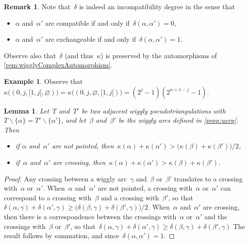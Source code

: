 \documentclass{amsart}
\newtheorem{lemma}[theorem]{Lemma}
\theoremstyle{definition}
\newtheorem{example}[theorem]{Example}
\newtheorem{remark}[theorem]{Remark}
\renewcommand{\b}[1]{{\boldsymbol{#1}}} %
\newcommand{\ssm}{\smallsetminus} %
\newcommand{\vincent}[1]{\todo[color=blue!30]{\rm #1 \\ \hfill --- V.}}
\begin{document}
\begin{remark}
Note that~$\delta$ is indeed an incompatibility degree in the sense that
\begin{itemize}
\item $\alpha$ and~$\alpha'$ are compatible if and only if~$\delta(\alpha, \alpha') = 0$,
\item $\alpha$ and~$\alpha'$ are exchangeable if and only if~$\delta(\alpha, \alpha') = 1$.
\end{itemize}
Observe also that~$\delta$ (and thus~$\kappa$) is preserved by the automorphisms of \cref{rem:wigglyComplexAutomorphism}.
\end{remark}


\begin{example}
Observe that
$\kappa \big( (0, j, {[1,j[}, \varnothing) \big) 
= \kappa \big( (0, j, \varnothing, {[1,j[}) \big) 
= (2^j-1)(2^{n+1-j}-1)$.
\end{example}

\begin{lemma}
\label{lem:wallCrossingInequalities}
Let~$T$ and~$T'$ be two adjacent wiggly pseudotriangulations with~$T \ssm \{\alpha\} = T' \ssm \{\alpha'\}$, and let~$\beta$ and~$\beta'$ be the wiggly arcs defined in \cref{prop:uerp}.
Then
\begin{itemize}
\item if $\alpha$ and~$\alpha'$ are not pointed, then~$\kappa(\alpha) + \kappa(\alpha') > \big( \kappa(\beta) + \kappa(\beta') \big) / 2$,
\item if~$\alpha$ and~$\alpha'$ are crossing, then~${\kappa(\alpha) + \kappa(\alpha') > \kappa(\beta) + \kappa(\beta')}$.
\end{itemize}
\end{lemma}

\begin{proof}
Any crossing between a wiggly arc~$\gamma$ and~$\beta$ or~$\beta'$ translates to a crossing with~$\alpha$ or~$\alpha'$.
When~$\alpha$ and~$\alpha'$ are not pointed, a crossing with~$\alpha$ or~$\alpha'$ can correspond to a crossing with~$\beta$ and a crossing with~$\beta'$, so that~$\delta(\alpha, \gamma) + \delta(\alpha', \gamma) \ge \big( \delta(\beta, \gamma) + \delta(\beta', \gamma) \big) / 2$.
When~$\alpha$ and~$\alpha'$ are crossing, then there is a correspondence between the crossings with~$\alpha$ or~$\alpha'$ and the crossings with~$\beta$ or~$\beta'$, so that~$\delta(\alpha, \gamma) + \delta(\alpha', \gamma) \ge \delta(\beta, \gamma) + \delta(\beta', \gamma)$
The result follows by summation, and since~$\delta(\alpha, \alpha') = 1$.
\end{proof}
\end{document}

